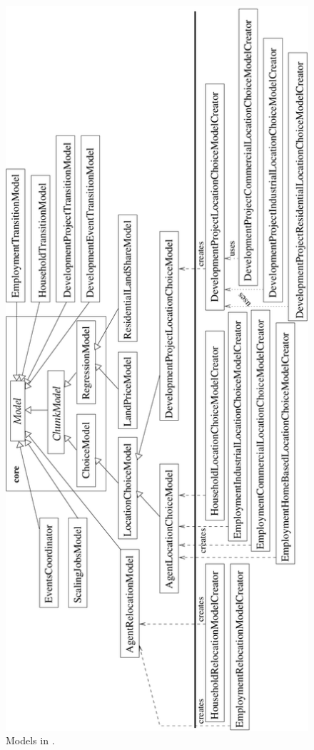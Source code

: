 \begin{figure}
\begin{center}
\includegraphics[scale=0.5, angle=-90]{images/urbansimmodels.pdf}
\caption{\label{fig:urbansim-model}\small Models in .}

\end{center}
\end{figure}
